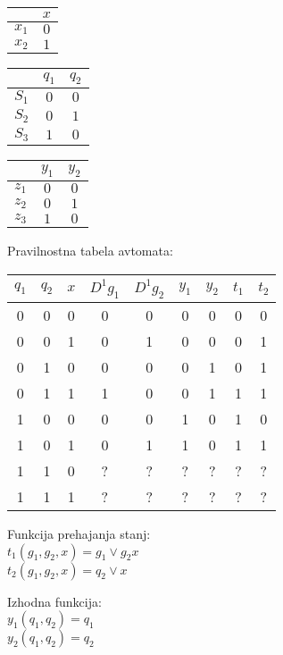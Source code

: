 \bigskip
\begin{tabular}{c|c}
& $x$\\
\hline
$x_1$ & $0$\\
$x_2$ & $1$
\end{tabular}
\hspace{1cm}
\begin{tabular}{c|cc}
& $q_1$ & $q_2$\\
\hline
$S_1$ & $0$ & $0$\\
$S_2$ & $0$ & $1$\\
$S_3$ & $1$ & $0$
\end{tabular}
\hspace{1cm}
\begin{tabular}{c|cc}
& $y_1$ & $y_2$\\
\hline
$z_1$ & $0$ & $0$\\
$z_2$ & $0$ & $1$\\
$z_3$ & $1$ & $0$
\end{tabular}

\bigskip
Pravilnostna tabela avtomata:

\bigskip
\begin{tabular}{ccc|cccc|cc}
$q_1$ & $q_2$ & $x$ & $D^1 g_1$ & $D^1 g_2$ & $y_1$ & $y_2$ & $t_1$ & $t_2$\\
\hline
0 & 0 & 0 & 0 & 0 & 0 & 0 & 0 & 0\\
0 & 0 & 1 & 0 & 1 & 0 & 0 & 0 & 1\\
0 & 1 & 0 & 0 & 0 & 0 & 1 & 0 & 1\\
0 & 1 & 1 & 1 & 0 & 0 & 1 & 1 & 1\\
1 & 0 & 0 & 0 & 0 & 1 & 0 & 1 & 0\\
1 & 0 & 1 & 0 & 1 & 1 & 0 & 1 & 1\\
1 & 1 & 0 & ? & ? & ? & ? & ? & ?\\
1 & 1 & 1 & ? & ? & ? & ? & ? & ?\\
\end{tabular}

\bigskip
Funkcija prehajanja stanj:\\
$t_1(g_1, g_2, x) = g_1 \vee g_2 x$\\
$t_2(g_1, g_2, x) = q_2 \vee x$

\bigskip
Izhodna funkcija:\\
$y_1(q_1, q_2) = q_1$\\
$y_2(q_1, q_2) = q_2$
